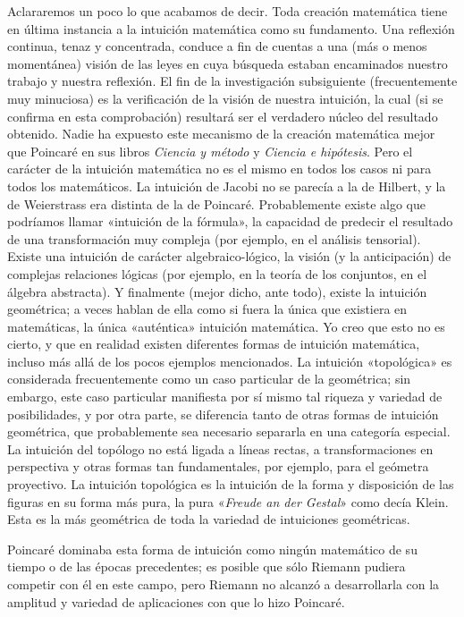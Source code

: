 \documentclass[a4paper, 12pt]{article}
\begin{document}
Aclararemos un poco lo que acabamos de decir. Toda creación matemática tiene en última instancia a la intuición matemática como su fundamento. Una reflexión continua, tenaz y concentrada, conduce a fin de cuentas a una (más o menos momentánea) visión de las leyes en cuya búsqueda estaban encaminados nuestro  trabajo y nuestra reflexión. El fin de la investigación subsiguiente (frecuentemente muy minuciosa) es la verificación de la visión de nuestra intuición, la cual (si se confirma en esta comprobación) resultará ser el verdadero núcleo del resultado obtenido. Nadie ha expuesto este mecanismo de la creación matemática mejor que Poincaré en sus libros {\it Ciencia y método} y {\it Ciencia e hipótesis}. Pero el carácter de la intuición matemática no es el mismo en todos los casos ni para todos los matemáticos. La intuición de Jacobi no se parecía a la de Hilbert, y la de Weierstrass era  distinta de la de Poincaré.
Probablemente existe algo que podríamos llamar «intuición de la fórmula», la capacidad de predecir el resultado de una transformación muy compleja (por ejemplo, en el análisis tensorial). Existe una intuición de carácter algebraico-lógico, la visión (y la anticipación) de complejas relaciones lógicas (por ejemplo, en la teoría de los conjuntos, en el álgebra abstracta). Y finalmente (mejor dicho, ante todo), existe la intuición geométrica; a veces hablan de ella como si fuera la única que existiera en matemáticas, la única «auténtica» intuición matemática. Yo creo que esto no es 
cierto, y que en realidad existen diferentes formas  de intuición matemática, incluso más allá de los pocos ejemplos mencionados. La intuición «topológica» es considerada frecuentemente como un caso particular de la geométrica; sin embargo, este caso particular manifiesta por sí mismo tal riqueza y variedad de posibilidades, y por otra parte, se diferencia tanto de otras  formas de intuición geométrica, que probablemente sea necesario separarla en una categoría especial. La intuición del topólogo no está ligada a líneas rectas, a transformaciones en perspectiva y otras formas tan fundamentales, por ejemplo, para el geómetra proyectivo. La intuición topológica es la intuición de la forma y disposición de las figuras en su forma más pura, la pura «{\it Freude an der Gestal}» como decía Klein. Esta es la
más geométrica de toda la variedad de intuiciones geométricas.

Poincaré dominaba esta forma de intuición como
ningún matemático de su tiempo o de las épocas precedentes; es posible que sólo Riemann pudiera competir  con él en este campo, pero Riemann no alcanzó a desarrollarla con la amplitud y variedad de aplicaciones  con que lo hizo Poincaré.
\end{document}
